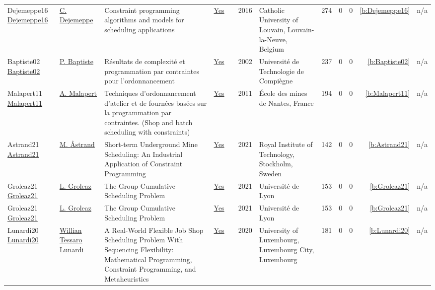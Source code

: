 {\begin{longtable}{>{\raggedright\arraybackslash}p{3cm}>{\raggedright\arraybackslash}p{6cm}>{\raggedright\arraybackslash}p{6.5cm}rrrp{2.5cm}rrrrr}
Dejemeppe16 \href{https://hdl.handle.net/2078.1/178078}{Dejemeppe16} & \hyperref[auth:a207]{C. Dejemeppe} & Constraint programming algorithms and models for scheduling applications & \href{../works/Dejemeppe16.pdf}{Yes} & \cite{Dejemeppe16} & 2016 & Catholic University of Louvain, Louvain-la-Neuve, Belgium & 274 & 0 & 0 & \ref{b:Dejemeppe16} & n/a\\
Baptiste02 \href{https://theses.hal.science/tel-00124998}{Baptiste02} & \hyperref[auth:a163]{P. Baptiste} & {R{\'e}sultats de complexit{\'e} et programmation par contraintes pour l'ordonnancement} & \href{../works/Baptiste02.pdf}{Yes} & \cite{Baptiste02} & 2002 & {Universit{\'e} de Technologie de Compi{\`e}gne} & 237 & 0 & 0 & \ref{b:Baptiste02} & n/a\\
Malapert11 \href{https://tel.archives-ouvertes.fr/tel-00630122}{Malapert11} & \hyperref[auth:a82]{A. Malapert} & Techniques d'ordonnancement d'atelier et de fourn{\'{e}}es bas{\'{e}}es sur la programmation par contraintes. (Shop and batch scheduling with constraints) & \href{../works/Malapert11.pdf}{Yes} & \cite{Malapert11} & 2011 & {\'{E}}cole des mines de Nantes, France & 194 & 0 & 0 & \ref{b:Malapert11} & n/a\\
Astrand21 \href{https://nbn-resolving.org/urn:nbn:se:kth:diva-294959}{Astrand21} & \hyperref[auth:a74]{M. {\AA}strand} & Short-term Underground Mine Scheduling: An Industrial Application of Constraint Programming & \href{../works/Astrand21.pdf}{Yes} & \cite{Astrand21} & 2021 & Royal Institute of Technology, Stockholm, Sweden & 142 & 0 & 0 & \ref{b:Astrand21} & n/a\\
Groleaz21 \href{https://hal.science/tel-03266690}{Groleaz21} & \hyperref[auth:a83]{L. Groleaz} & {The Group Cumulative Scheduling Problem} & \href{../works/Groleaz21.pdf}{Yes} & \cite{Groleaz21} & 2021 & {Universit{\'e} de Lyon} & 153 & 0 & 0 & \ref{b:Groleaz21} & n/a\\
Groleaz21 \href{https://hal.science/tel-03266690}{Groleaz21} & \hyperref[auth:a83]{L. Groleaz} & {The Group Cumulative Scheduling Problem} & \href{../works/Groleaz21.pdf}{Yes} & \cite{Groleaz21} & 2021 & {Universit{\'e} de Lyon} & 153 & 0 & 0 & \ref{b:Groleaz21} & n/a\\
Lunardi20 \href{http://orbilu.uni.lu/handle/10993/43893}{Lunardi20} & \hyperref[auth:a499]{Willian Tessaro Lunardi} & A Real-World Flexible Job Shop Scheduling Problem With Sequencing Flexibility: Mathematical Programming, Constraint Programming, and Metaheuristics & \href{../works/Lunardi20.pdf}{Yes} & \cite{Lunardi20} & 2020 & University of Luxembourg, Luxembourg City, Luxembourg & 181 & 0 & 0 & \ref{b:Lunardi20} & n/a\\

\end{longtable}}
